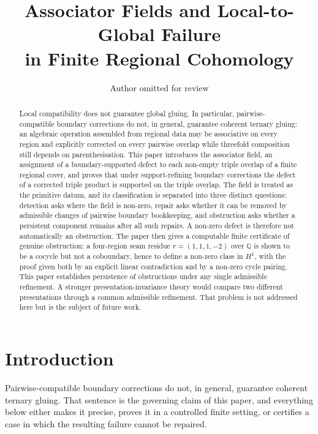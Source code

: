 \documentclass[11pt]{article}
\title{Associator Fields and Local-to-Global Failure\\ in Finite Regional Cohomology}
\author{Author omitted for review}
\date{}
\newcommand{\Q}{\mathbb{Q}}
\begin{document}
\maketitle

\begin{abstract}
Local compatibility does not guarantee global gluing. In particular, pairwise-compatible boundary corrections do not, in general, guarantee coherent ternary gluing: an algebraic operation assembled from regional data may be associative on every region and explicitly corrected on every pairwise overlap while threefold composition still depends on parenthesisation. This paper introduces the associator field, an assignment of a boundary-supported defect to each non-empty triple overlap of a finite regional cover, and proves that under support-refining boundary corrections the defect of a corrected triple product is supported on the triple overlap. The field is treated as the primitive datum, and its classification is separated into three distinct questions: detection asks where the field is non-zero, repair asks whether it can be removed by admissible changes of pairwise boundary bookkeeping, and obstruction asks whether a persistent component remains after all such repairs. A non-zero defect is therefore not automatically an obstruction. The paper then gives a computable finite certificate of genuine obstruction: a four-region seam residue \(r=(1,1,1,-2)\) over \(\Q\) is shown to be a cocycle but not a coboundary, hence to define a non-zero class in \(H^1\), with the proof given both by an explicit linear contradiction and by a non-zero cycle pairing. This paper establishes persistence of obstructions under any single admissible refinement. A stronger presentation-invariance theory would compare two different presentations through a common admissible refinement. That problem is not addressed here but is the subject of future work.
\end{abstract}

\section{Introduction}

Pairwise-compatible boundary corrections do not, in general, guarantee coherent ternary gluing. That sentence is the governing claim of this paper, and everything below either makes it precise, proves it in a controlled finite setting, or certifies a case in which the resulting failure cannot be repaired.
\end{document}
